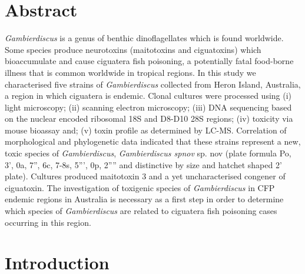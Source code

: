 \documentclass[12pt]{article}
\begin{document}
\section{Abstract}
\textit{Gambierdiscus} is a genus of benthic dinoflagellates which is found worldwide. Some species produce neurotoxins (maitotoxins and ciguatoxins) which  bioaccumulate and cause ciguatera fish poisoning, a potentially fatal food-borne illness that is common worldwide in tropical regions. In this study we characterised five strains of \textit{Gambierdiscus} collected from Heron Island,  Australia, a region in which ciguatera is endemic. Clonal cultures were processed using (i) light microscopy; (ii) scanning electron microscopy; (iii) DNA sequencing based on the nuclear encoded ribosomal  18S and D8-D10 28S regions; (iv) toxicity via mouse bioassay and; (v) toxin profile as determined by LC-MS. Correlation of morphological and phylogenetic data indicated that these strains represent a new, toxic species of \emph{Gambierdiscus}, \emph{Gambierdiscus spnov} sp. nov (plate formula Po, 3', 0a, 7'', 6c, 7-8s, 5''', 0p, 2'''' and distinctive by size and hatchet shaped 2' plate). Cultures produced maitotoxin 3 and a yet uncharacterised congener of ciguatoxin. The investigation of toxigenic species of \textit{Gambierdiscus} in CFP endemic regions in Australia is necessary as a first step in order to determine which species of \textit{Gambierdiscus} are related to ciguatera fish poisoning cases occurring in this region.

\newpage

\section{Introduction}
\end{document}
